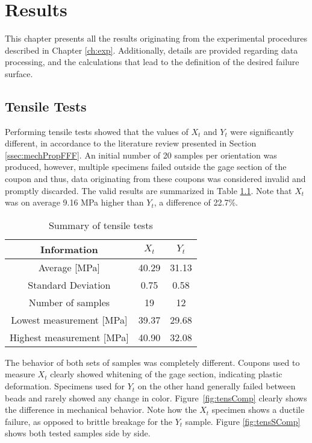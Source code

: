 \documentclass[main.tex]{subfiles}
\begin{document}
\chapter{Results} \label{ch:res}

This chapter presents all the results originating from the experimental procedures described in Chapter \ref{ch:exp}. Additionally, details are provided regarding data processing, and the calculations that lead to the definition of the desired failure surface. 

\section{Tensile Tests} \label{sec:tensr}
Performing tensile tests showed that the values of $X_t$ and $Y_t$ were significantly different, in accordance to the literature review presented in Section \ref{ssec:mechPropFFF}. An initial number of 20 samples per orientation was produced, however, multiple specimens failed outside the gage section of the coupon and thus, data originating from these coupons was considered invalid and promptly discarded. The valid results are summarized in Table \ref{tab:tensrtab}. Note that $X_t$ was on average 9.16 MPa higher than $Y_t$, a difference of 22.7\%.
\begin{table} [h]
	\centering
	\caption{Summary of tensile tests}
\begin{tabular}{ c| c c } 
	\toprule
	\textbf{Information} & $X_t$ & $Y_t$\\
	\midrule
	Average [MPa] & 40.29 & 31.13\\
	Standard Deviation & 0.75 & 0.58\\
	Number of samples & 19 & 12\\
	Lowest measurement [MPa] &39.37  & 29.68\\
	Highest measurement [MPa] &40.90 & 32.08\\
	\bottomrule
\end{tabular}
\label{tab:tensrtab}
\end{table}

The behavior of both sets of samples was completely different. Coupons used to measure $X_t$ clearly showed whitening of the gage section, indicating plastic deformation. Specimens used for $Y_t$ on the other hand generally failed between beads and rarely showed any change in color. Figure~\ref{fig:tensComp} clearly shows the difference in mechanical behavior. Note how the $X_t$ specimen shows a ductile failure, as opposed to brittle breakage for the $Y_t$ sample. Figure \ref{fig:tensSComp} shows both tested samples side by side.
\pagebreak
\end{document}
